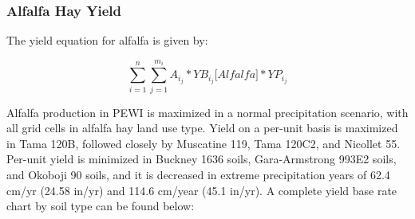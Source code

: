 \documentclass[11pt]{article}
\begin{document}
\subsubsection{Alfalfa Hay Yield}
The yield equation for alfalfa is given by:

$$\sum_{i=1}^{n} \sum_{j=1}^{m_i} A_i_j *YB_i_j\bigg[Alfalfa\bigg]*YP_i_j$$

Alfalfa production in PEWI is maximized in a normal precipitation scenario, with all grid cells in alfalfa hay land use type. Yield on a per-unit basis is maximized in Tama 120B, followed closely by Muscatine 119, Tama 120C2, and Nicollet 55. Per-unit yield is minimized in Buckney 1636 soils, Gara-Armstrong 993E2 soils, and Okoboji 90 soils, and it is decreased in extreme precipitation years of 62.4 cm/yr (24.58 in/yr) and 114.6 cm/year (45.1 in/yr). A complete yield base rate chart by soil type can be found below:
\end{document}
